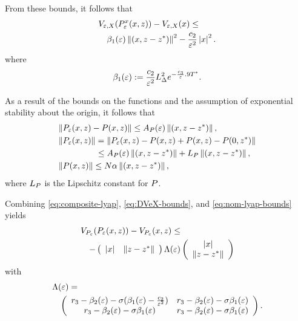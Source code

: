 \begin{frame}[t]
   {
    From these bounds, it follows that
    \begin{align*}
      \lefteqn{\Vex(\Pex\argsxz) - \Vex(\zdx) \leq}\\
      &&\bepsone \nzdxzst^{2} - \frac{c_{2}}{\resclfparam^{2}} \nzdx^{2}.
    \end{align*}
    where
    \begin{align*}
      \bepsone := \frac{c_{2}}{\resclfparam^{2}} \LDelta^{2}
      e^{-\frac{c_{3}}{\resclfparam} .9 \Tst}.
    \end{align*}
  }

   {
    As a result of the bounds on the \tti{} functions and the assumption of exponential stability about the origin, it follows that
  \begin{align*}
    &\| \Pe\argsxz - \P\argsxz \| \leq \Ae \nzdxzst,\\
    &\| \Pe\argsxz \| = \| \Pe\argsxz - \P\argsxz + \P\argsxz - \P\xzst\|\\
    & \hspace{4.4em} \leq \Ae \nzdxzst  + \LP\nzdxzst,\\
    &\| \P\argsxz \| \leq N \alpha \nzdxzst,
  \end{align*}
  where $\LP$ is the Lipschitz constant for $\P$.
}
  
   {
    Combining \eqref{eq:composite-lyap}, \eqref{eq:DVeX-bounds}, and \eqref{eq:nom-lyap-bounds} yields
    \begin{align*}
      \lefteqn{\VP(\Pe\argsxz) - \VP\argsxz \leq}\\
      &&-\left(\begin{array}{c c}
          \nzdx & \nzdzst
        \end{array}\right)
      \Le
      \left(\begin{array}{c}
          \nzdx\\
          \nzdzst
        \end{array}\right)
    \end{align*}
    with
    \begin{align*}
      \lefteqn{\Le =}\\
      &&\left(\begin{array}{c c}
          r_{3} - \bepstwo - \sigma (\bepsone - \frac{c_{2}}{\resclfparam^{2}}) & r_{3} - \bepstwo - \sigma \bepsone\\
          r_{3} - \bepstwo - \sigma \bepsone & r_{3} - \bepstwo - \sigma \bepsone
        \end{array}\right).
    \end{align*}
  }
\end{frame}
